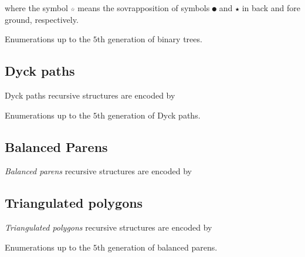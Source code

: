
\begin{margintable}
where the symbol \verb|☆| means the sovrapposition of symbols \verb|●| and
\verb|★| in back and fore ground, respectively.
\caption{Enumerations up to the $5$th generation of binary trees.}
\end{margintable}

\subsection{Dyck paths}

Dyck paths recursive structures are encoded by


\begin{margintable}
\caption{Enumerations up to the $5$th generation of Dyck paths.}
\end{margintable}

\subsection{Balanced Parens}

\textit{Balanced parens} recursive structures are encoded by


\newpage
\subsection{Triangulated polygons}

\textit{Triangulated polygons} recursive structures are encoded by

\begin{margintable}
\caption{Enumerations up to the $5$th generation of balanced parens.}
\end{margintable}

